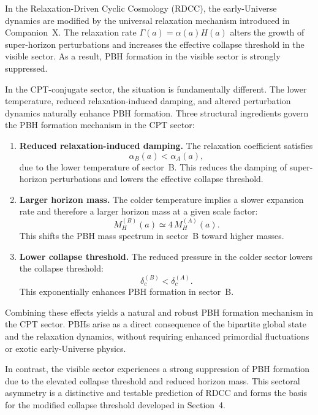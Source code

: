 \documentclass[11pt,a4paper]{article}
\begin{document}
In the Relaxation-Driven Cyclic Cosmology (RDCC), the early-Universe dynamics are modified
by the universal relaxation mechanism introduced in Companion~X. The relaxation rate
\(\Gamma(a) = \alpha(a) H(a)\) alters the growth of super-horizon perturbations and increases the
effective collapse threshold in the visible sector. As a result, PBH formation in the visible sector
is strongly suppressed.

In the CPT-conjugate sector, the situation is fundamentally different. The lower temperature,
reduced relaxation-induced damping, and altered perturbation dynamics naturally enhance PBH
formation. Three structural ingredients govern the PBH formation mechanism in the CPT sector:

\begin{enumerate}[label=(\alph*)]

\item \textbf{Reduced relaxation-induced damping.}  
The relaxation coefficient satisfies
\begin{equation}
\alpha_{B}(a) < \alpha_{A}(a),
\end{equation}
due to the lower temperature of sector~B. This reduces the damping of super-horizon
perturbations and lowers the effective collapse threshold.

\item \textbf{Larger horizon mass.}  
The colder temperature implies a slower expansion rate and therefore a larger horizon mass
at a given scale factor:
\begin{equation}
M_{H}^{(B)}(a) \simeq 4\, M_{H}^{(A)}(a).
\end{equation}
This shifts the PBH mass spectrum in sector~B toward higher masses.

\item \textbf{Lower collapse threshold.}  
The reduced pressure in the colder sector lowers the collapse threshold:
\begin{equation}
\delta_{c}^{(B)} < \delta_{c}^{(A)}.
\end{equation}
This exponentially enhances PBH formation in sector~B.
\end{enumerate}

Combining these effects yields a natural and robust PBH formation mechanism in the CPT
sector. PBHs arise as a direct consequence of the bipartite global state and the relaxation
dynamics, without requiring enhanced primordial fluctuations or exotic early-Universe physics.

In contrast, the visible sector experiences a strong suppression of PBH formation due to the
elevated collapse threshold and reduced horizon mass. This sectoral asymmetry is a distinctive
and testable prediction of RDCC and forms the basis for the modified collapse threshold
developed in Section~4.
\end{document}
